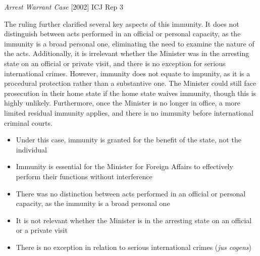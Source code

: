 \begin{casedetails}{\textit{Arrest Warrant Case} [2002] ICJ Rep 3}
    \vspace{\baselineskip}

    The ruling further clarified several key aspects of this immunity. It does not distinguish between acts performed in an official or personal capacity, as the immunity is a broad personal one, eliminating the need to examine the nature of the acts. Additionally, it is irrelevant whether the Minister was in the arresting state on an official or private visit, and there is no exception for serious international crimes. However, immunity does not equate to impunity, as it is a procedural protection rather than a substantive one. The Minister could still face prosecution in their home state if the home state waives immunity, though this is highly unlikely. Furthermore, once the Minister is no longer in office, a more limited residual immunity applies, and there is no immunity before international criminal courts.
\end{casedetails}

\begin{itemize}
    \item Under this case, immunity is granted for the benefit of the state, not the individual
    \item Immunity is essential for the Minister for Foreign Affairs to effectively perform their functions without interference
    \item There was no distinction between acts performed in an official or personal capacity, as the immunity is a broad personal one
    \item It is not relevant whether the Minister is in the arresting state on an official or a private visit
    \item There is no exception in relation to serious international crimes (\textit{jus cogens})
\end{itemize}

